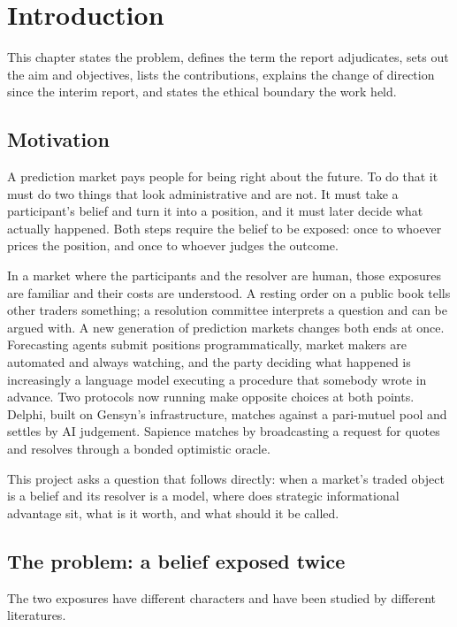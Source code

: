 \chapter{Introduction}
\label{ch:introduction}


This chapter states the problem, defines the term the report adjudicates, sets out the aim
and objectives, lists the contributions, explains the change of direction since the interim
report, and states the ethical boundary the work held.

\section{Motivation}
\label{sec:motivation}

A prediction market pays people for being right about the future. To do that it must do two
things that look administrative and are not. It must take a participant's belief and turn it
into a position, and it must later decide what actually happened. Both steps require the
belief to be exposed: once to whoever prices the position, and once to whoever judges the
outcome.

In a market where the participants and the resolver are human, those exposures are familiar
and their costs are understood. A resting order on a public book tells other traders
something; a resolution committee interprets a question and can be argued with. A new
generation of prediction markets changes both ends at once. Forecasting agents submit
positions programmatically, market makers are automated and always watching, and the party
deciding what happened is increasingly a language model executing a procedure that somebody
wrote in advance. Two protocols now running make opposite choices at both points. Delphi,
built on Gensyn's infrastructure, matches against a pari-mutuel pool and settles by AI
judgement. Sapience matches by broadcasting a request for quotes and resolves through a
bonded optimistic oracle.

This project asks a question that follows directly: when a market's traded object is a
belief and its resolver is a model, where does strategic informational advantage sit, what
is it worth, and what should it be called.

\section{The problem: a belief exposed twice}
\label{sec:problem}

The two exposures have different characters and have been studied by different literatures.

